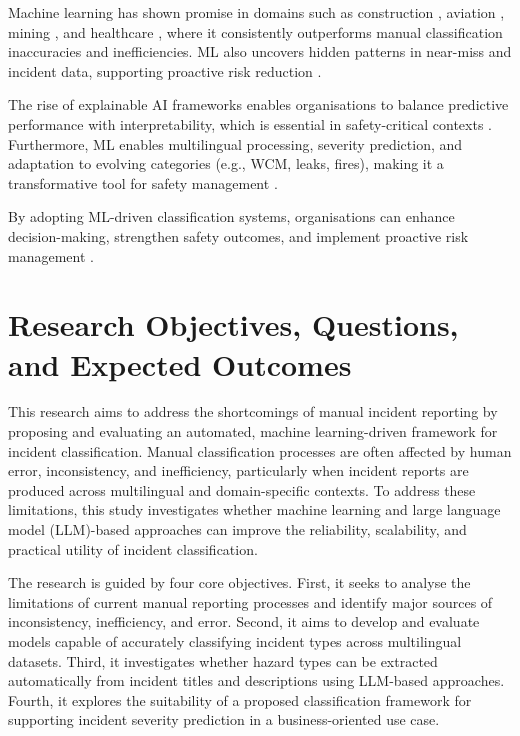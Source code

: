 \documentclass[11pt, titlepage, bibliography=totoc]{scrreprt}
\begin{document}
Machine learning has shown promise in domains such as construction \cite{Zhong2020}, aviation \cite{Madeira2021}, mining \cite{8_Ganguli}, and healthcare \cite{islam2024}, where it consistently outperforms manual classification inaccuracies and inefficiencies. ML also uncovers hidden patterns in near-miss and incident data, supporting proactive risk reduction \cite{Fang}.

The rise of explainable AI frameworks enables organisations to balance predictive performance with interpretability, which is essential in safety-critical contexts \cite{sarkar2020review}. Furthermore, ML enables multilingual processing, severity prediction, and adaptation to evolving categories (e.g., WCM, leaks, fires), making it a transformative tool for safety management \cite{balasubramanian2021safeone}.

By adopting ML-driven classification systems, organisations can enhance decision-making, strengthen safety outcomes, and implement proactive risk management \cite{Stefana2024}.

\newpage

\section{Research Objectives, Questions, and Expected Outcomes}
\label{chapterGeneral}

This research aims to address the shortcomings of manual incident reporting by proposing and evaluating an automated, machine learning-driven framework for incident classification. Manual classification processes are often affected by human error, inconsistency, and inefficiency, particularly when incident reports are produced across multilingual and domain-specific contexts. To address these limitations, this study investigates whether machine learning and large language model (LLM)-based approaches can improve the reliability, scalability, and practical utility of incident classification.

The research is guided by four core objectives. First, it seeks to analyse the limitations of current manual reporting processes and identify major sources of inconsistency, inefficiency, and error. Second, it aims to develop and evaluate models capable of accurately classifying incident types across multilingual datasets. Third, it investigates whether hazard types can be extracted automatically from incident titles and descriptions using LLM-based approaches. Fourth, it explores the suitability of a proposed classification framework for supporting incident severity prediction in a business-oriented use case.
\end{document}
